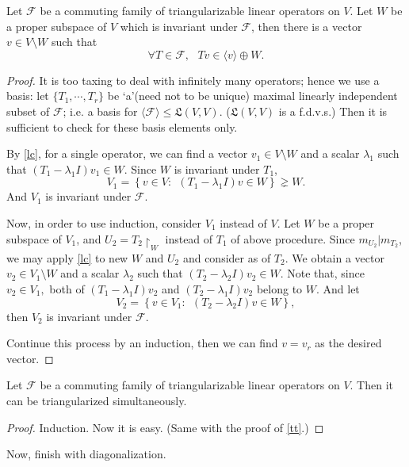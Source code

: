 \begin{lemma}Let $\mathscr F$ be a commuting family of triangularizable linear operators on $V$. Let $W$ be a proper subspace of $V$ which is invariant under $\mathscr F$, then there is a vector $v\in V\setminus W$ such that $$\forall T\in\mathscr F, ~~~ Tv \in \langle v \rangle \oplus W.$$ 
\end{lemma}
\begin{proof}It is too taxing to deal with infinitely many operators; hence we use a basis: let $\{T_1, \cdots, T_r\}$ be `a'(need not to be unique) maximal linearly independent subset of $\mathscr F$; i.e. a basis for $\langle \mathscr F \rangle \le \mathfrak L(V,V).$ ($\mathfrak L(V,V)$ is a f.d.v.s.) Then it is sufficient to check for these basis elements only.

By \cref{lc}, for a single operator, we can find a vector $v_1\in V \setminus W$ and a scalar $\lambda_1$ such that $(T_1 - \lambda_1 I)v_1 \in W.$ Since $W$ is invariant under $T_1$, $$V_1 = \left\{v\in V:~~(T_1 - \lambda_1 I)v \in W \right\} \gneq W.$$ And $V_1$ is invariant under $\mathscr F$.

Now, in order to use induction, consider $V_1$ instead of $V$. Let $W$ be a proper subspace of $V_1$, and $U_2 = T_2 \upharpoonright _W$ instead of $T_1$ of above procedure. Since $m_{U_2} | m_{T_2}$, we may apply \cref{lc} to new $W$ and $U_2$ and consider as of $T_2$. We obtain a vector $v_2 \in V_1 \setminus W$ and a scalar $\lambda_2$ such that $(T_2 - \lambda_2 I)v_2 \in W.$ Note that, since $v_2 \in V_1,$ both of $(T_1 - \lambda_1 I)v_2$ and $(T_2 - \lambda_1 I)v_2$ belong to $W$. And let $$V_2 =\left\{v\in V_1:~~(T_2 - \lambda_2 I)v \in W\right\},$$ then $V_2$ is invariant under $\mathscr F$.

Continue this process by an induction, then we can find $v = v_r$ as the desired vector.
\end{proof}
\begin{theorem}Let $\mathscr F$ be a commuting family of triangularizable linear operators on $V$. Then it can be triangularized simultaneously.
\end{theorem}
\begin{proof}
Induction. Now it is easy. (Same with the proof of \cref{tt}.)
\end{proof}

Now, finish with diagonalization.

